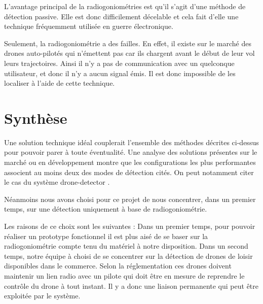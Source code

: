 L'avantage principal de la radiogoniométries est qu'il s'agit d'une méthode de détection passive. Elle est donc difficilement décelable et cela fait d'elle une technique fréquemment utilisée en guerre électronique. 

Seulement, la radiogoniométrie a des failles. En effet, il existe sur le marché des drones auto-pilotés qui n'émettent pas car ils chargent avant le début de leur vol leurs trajectoires. Ainsi il n'y a pas de communication avec un quelconque utilisateur, et donc il n'y a aucun signal émis. Il est donc impossible de les localiser à l'aide de cette technique.





\section{Synthèse}

Une solution technique idéal couplerait l'ensemble des méthodes décrites ci-dessus pour pouvoir parer à toute éventualité. Une analyse des solutions présentes sur le marché ou en développement montre que les configurations les plus performantes associent au moins deux des modes de détection cités. On peut notamment citer le cas du système drone-detector \cite{dronedetector}.

Néanmoins nous avons choisi pour ce projet de nous concentrer, dans un premier temps, sur une détection uniquement à base de radiogoniométrie.

Les raisons de ce choix sont les suivantes : Dans un premier temps, pour pouvoir réaliser un prototype fonctionnel il est plus aisé de se baser sur la radiogoniométrie compte tenu du matériel à notre disposition. Dans un second temps, notre équipe à choisi de se concentrer sur la détection de drones de loisir disponibles dans le commerce. Selon la réglementation ces drones doivent maintenir un lien radio avec un pilote qui doit être en mesure de reprendre le contrôle du drone à tout instant. Il y a donc une liaison permanente qui peut être exploitée par le système.







